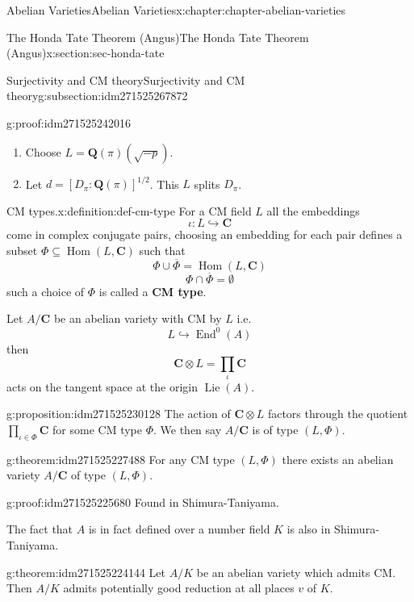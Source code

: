 \documentclass[oneside,10pt,]{book}
\newcommand{\terminology}[1]{\textbf{#1}}
\numberwithin{equation}{section}
\DeclareMathOperator{\Lie}{Lie}
\newcommand{\lb}{[}
\newcommand{\rb}{]}
\newcommand{\QQ}{\mathbf{Q}}
\newcommand{\CC}{\mathbf{C}}
\DeclareMathOperator{\End}{End}
\DeclareMathOperator{\Hom}{Hom}
\begin{document}
\begin{chapterptx}{Abelian Varieties}{}{Abelian Varieties}{}{}{x:chapter:chapter-abelian-varieties}
\begin{sectionptx}{The Honda Tate Theorem (Angus)}{}{The Honda Tate Theorem (Angus)}{}{}{x:section:sec-honda-tate}
\begin{subsectionptx}{Surjectivity and CM theory}{}{Surjectivity and CM theory}{}{}{g:subsection:idm271525267872}
\begin{proofptx}{}{g:proof:idm271525242016}
\begin{enumerate}
\item{}Choose \(L = \QQ(\pi)(\sqrt{-p})\).%
\item{}Let \(d= \lb D_\pi: \QQ(\pi)\rb^{1/2}\). This \(L\) splits \(D_\pi\).%
\end{enumerate}
%
\end{proofptx}
\begin{definition}{CM types.}{x:definition:def-cm-type}%
For a CM field \(L\) all the embeddings%
\begin{equation*}
\iota\colon L \hookrightarrow \CC
\end{equation*}
come in complex conjugate pairs, choosing an embedding for each pair defines a subset \(\Phi\subseteq \Hom(L, \CC)\) such that%
\begin{equation*}
\Phi \cup \overline \Phi = \Hom(L,\CC)
\end{equation*}
%
\begin{equation*}
\Phi \cap \overline \Phi = \emptyset
\end{equation*}
such a choice of \(\Phi \) is called a \terminology{CM type}.%
\end{definition}
Let \(A/\CC\) be an abelian variety with CM by \(L\) i.e.%
\begin{equation*}
L\hookrightarrow \End^0(A)
\end{equation*}
then%
\begin{equation*}
\CC\otimes L = \prod_\iota \CC
\end{equation*}
acts on the tangent space at the origin \(\Lie(A)\).%
\begin{proposition}{}{}{g:proposition:idm271525230128}%
The action of \(\CC\otimes L\) factors through the quotient \(\prod_{\iota\in \Phi} \CC\) for some CM type \(\Phi\). We then say \(A/\CC\) is of type \((L,\Phi)\).%
\end{proposition}
\begin{theorem}{}{}{g:theorem:idm271525227488}%
For any CM type \((L,\Phi)\) there exists an abelian variety \(A/\CC\) of type \((L, \Phi)\).%
\end{theorem}
\begin{proofptx}{}{g:proof:idm271525225680}
Found in Shimura-Taniyama.%
\end{proofptx}
The fact that \(A\) is in fact defined over  a number field \(K\) is also in Shimura-Taniyama.%
\begin{theorem}{}{}{g:theorem:idm271525224144}%
Let \(A/K\) be an abelian variety which admits CM. Then \(A/K\) admits potentially good reduction at all places \(v\) of \(K\).%

\end{theorem}
\end{subsectionptx}
\end{sectionptx}
\end{chapterptx}
\end{document}
